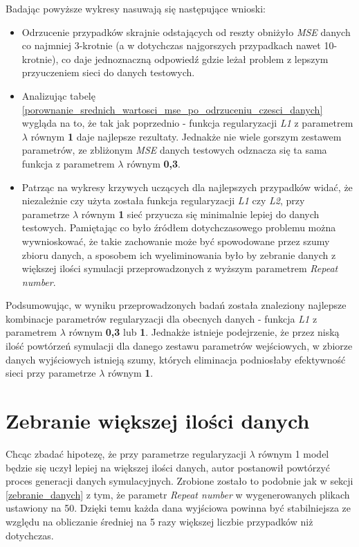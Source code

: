 \documentclass[12pt]{aghdpl}
\begin{document}
		Badając powyższe wykresy nasuwają się następujące wnioski:
		\begin{itemize}
		\item Odrzucenie przypadków skrajnie odstających od reszty obniżyło \textit{MSE} danych co najmniej 3-krotnie (a w dotychczas najgorszych przypadkach nawet 10-krotnie), co daje jednoznaczną odpowiedź gdzie leżał problem z lepszym przyuczeniem sieci do danych testowych.
		\item Analizując tabelę \ref{porownanie_srednich_wartosci_mse_po_odrzuceniu_czesci_danych} wygląda na to, że tak jak poprzednio - funkcja regularyzacji \textit{L1} z parametrem $\lambda$ równym \textbf{1} daje najlepsze rezultaty. Jednakże nie wiele gorszym zestawem parametrów, ze zbliżonym \textit{MSE} danych testowych odznacza się ta sama funkcja z parametrem $\lambda$ równym \textbf{0,3}.
		\item Patrząc na wykresy krzywych uczących dla najlepszych przypadków widać, że niezależnie czy użyta została funkcja regularyzacji \textit{L1} czy \textit{L2}, przy parametrze $\lambda$ równym \textbf{1} sieć przyucza się minimalnie lepiej do danych testowych. Pamiętając co było źródłem dotychczasowego problemu można wywnioskować, że takie zachowanie może być spowodowane przez szumy zbioru danych, a sposobem ich wyeliminowania było by zebranie danych z większej ilości symulacji przeprowadzonych z wyższym parametrem \textit{Repeat number}.
		\end{itemize}
		
		Podsumowując, w wyniku przeprowadzonych badań została znaleziony najlepsze kombinacje parametrów regularyzacji dla obecnych danych - funkcja \textit{L1} z parametrem $\lambda$ równym \textbf{0,3} lub \textbf{1}. Jednakże istnieje podejrzenie, że przez niską ilość powtórzeń symulacji dla danego zestawu parametrów wejściowych, w zbiorze danych wyjściowych istnieją szumy, których eliminacja podniosłaby efektywność sieci przy parametrze $\lambda$ równym \textbf{1}.
		
		\section{Zebranie większej ilości danych}	
		Chcąc zbadać hipotezę, że przy parametrze regularyzacji $\lambda$ równym 1 model będzie się uczył lepiej na większej ilości danych, autor postanowił powtórzyć proces generacji danych symulacyjnych. Zrobione zostało to podobnie jak w sekcji \ref{zebranie_danych} z tym, że parametr \textit{Repeat number} w wygenerowanych plikach ustawiony na 50. Dzięki temu każda dana wyjściowa powinna być stabilniejsza ze względu na obliczanie średniej na 5 razy większej liczbie przypadków niż dotychczas.
		
\end{document}
